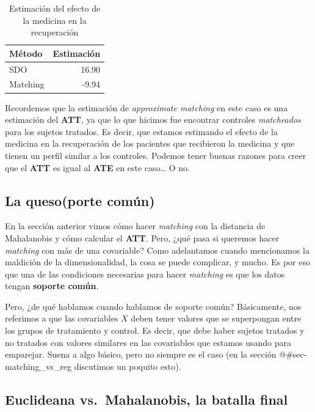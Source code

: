 \documentclass[
  letterpaper,
  DIV=11,
  numbers=noendperiod,
  oneside]{scrreprt}
\begin{document}
\begin{table}
\caption*{
{\large Estimación del efecto de la medicina en la recuperación}
} 
\fontsize{12.0pt}{14.4pt}\selectfont
\begin{tabular*}{\linewidth}{@{\extracolsep{\fill}}lr}
\toprule
Método & Estimación \\ 
\midrule\addlinespace[2.5pt]
SDO & 16.90 \\ 
Matching & -9.94 \\ 
\bottomrule
\end{tabular*}
\end{table}

Recordemos que la estimación de \emph{approximate matching} en este caso
es una estimación del \textbf{ATT}, ya que lo que hicimos fue encontrar
controles \emph{matcheados} para los sujetos tratados. Es decir, que
estamos estimando el efecto de la medicina en la recuperación de los
pacientes que recibieron la medicina y que tienen un perfil similar a
los controles. Podemos tener buenas razones para creer que el
\textbf{ATT} es igual al \textbf{ATE} en este caso\ldots{} O no.

\hypertarget{la-quesoporte-comuxfan}{%
\subsection{La queso(porte común)}\label{la-quesoporte-comuxfan}}

En la sección anterior vimos cómo hacer \emph{matching} con la distancia
de Mahalanobis y cómo calcular el \textbf{ATT}. Pero, ¿qué pasa si
queremos hacer \emph{matching} con más de una covariable? Como
adelantamos cuando mencionamos la maldición de la dimensionalidad, la
cosa se puede complicar, y mucho. Es por eso que una de las condiciones
necesarias para hacer \emph{matching} es que los datos tengan
\textbf{soporte común}.

Pero, ¿de qué hablamos cuando hablamos de soporte común? Básicamente,
nos referimos a que las covariables \(X\) deben tener valores que se
superpongan entre los grupos de tratamiento y control. Es decir, que
debe haber sujetos tratados y no tratados con valores similares en las
covariables que estamos usando para emparejar. Suena a algo básico, pero
no siempre es el caso (en la sección @\#sec-matching\_vs\_reg discutimos
un poquito esto).

\hypertarget{euclideana-vs.-mahalanobis-la-batalla-final}{%
\subsection{Euclideana vs.~Mahalanobis, la batalla
final}\label{euclideana-vs.-mahalanobis-la-batalla-final}}
\end{document}
